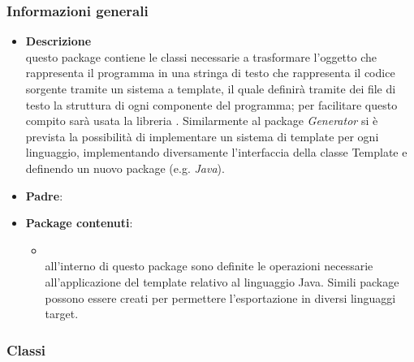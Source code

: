 \subsubsection{Informazioni generali}
\begin{itemize}
\item \textbf{Descrizione}\\
questo package contiene le classi necessarie a trasformare l'oggetto che rappresenta il programma in una stringa di testo che rappresenta il codice sorgente tramite un sistema a template, il quale definirà tramite dei file di testo la struttura di ogni componente del programma; per facilitare questo compito sarà usata la libreria \stringtemplate{}. Similarmente al package \emph{Generator} si è prevista la possibilità di implementare un sistema di template per ogni linguaggio, implementando diversamente l'interfaccia della classe Template e definendo un nuovo package (e.g. \emph{Java}).
\item \textbf{Padre}: \hyperref[\nogloxy{SWEDesigner::Server}]{}
\item \textbf{Package contenuti}:
\begin{itemize}
\item \hyperref[\nogloxy{SWEDesigner::Server::Template::Java}]{}\\
all'interno di questo package sono definite le operazioni necessarie all'applicazione del template relativo al linguaggio Java. Simili package possono essere creati per permettere l'esportazione in diversi linguaggi target.
\end{itemize}
\end{itemize}
\subsubsection{Classi}
